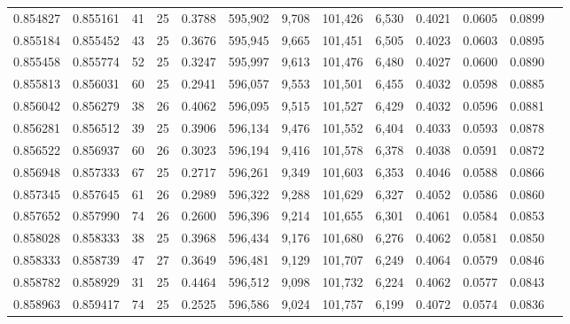 \begin{tabular}{rrrrrrrrrrrrr}
0.854827 & 0.855161 &    41 &  25 &                                     0.3788 & 595,902 &   9,708 & 101,426 &   6,530 & 0.4021 & 0.0605 & 0.0899 \\
0.855184 & 0.855452 &    43 &  25 &                                     0.3676 & 595,945 &   9,665 & 101,451 &   6,505 & 0.4023 & 0.0603 & 0.0895 \\
0.855458 & 0.855774 &    52 &  25 &                                     0.3247 & 595,997 &   9,613 & 101,476 &   6,480 & 0.4027 & 0.0600 & 0.0890 \\
0.855813 & 0.856031 &    60 &  25 &                                     0.2941 & 596,057 &   9,553 & 101,501 &   6,455 & 0.4032 & 0.0598 & 0.0885 \\
0.856042 & 0.856279 &    38 &  26 &                                     0.4062 & 596,095 &   9,515 & 101,527 &   6,429 & 0.4032 & 0.0596 & 0.0881 \\
0.856281 & 0.856512 &    39 &  25 &                                     0.3906 & 596,134 &   9,476 & 101,552 &   6,404 & 0.4033 & 0.0593 & 0.0878 \\
0.856522 & 0.856937 &    60 &  26 &                                     0.3023 & 596,194 &   9,416 & 101,578 &   6,378 & 0.4038 & 0.0591 & 0.0872 \\
0.856948 & 0.857333 &    67 &  25 &                                     0.2717 & 596,261 &   9,349 & 101,603 &   6,353 & 0.4046 & 0.0588 & 0.0866 \\
0.857345 & 0.857645 &    61 &  26 &                                     0.2989 & 596,322 &   9,288 & 101,629 &   6,327 & 0.4052 & 0.0586 & 0.0860 \\
0.857652 & 0.857990 &    74 &  26 &                                     0.2600 & 596,396 &   9,214 & 101,655 &   6,301 & 0.4061 & 0.0584 & 0.0853 \\
0.858028 & 0.858333 &    38 &  25 &                                     0.3968 & 596,434 &   9,176 & 101,680 &   6,276 & 0.4062 & 0.0581 & 0.0850 \\
0.858333 & 0.858739 &    47 &  27 &                                     0.3649 & 596,481 &   9,129 & 101,707 &   6,249 & 0.4064 & 0.0579 & 0.0846 \\
0.858782 & 0.858929 &    31 &  25 &                                     0.4464 & 596,512 &   9,098 & 101,732 &   6,224 & 0.4062 & 0.0577 & 0.0843 \\
0.858963 & 0.859417 &    74 &  25 &                                     0.2525 & 596,586 &   9,024 & 101,757 &   6,199 & 0.4072 & 0.0574 & 0.0836 \\

\end{tabular}
